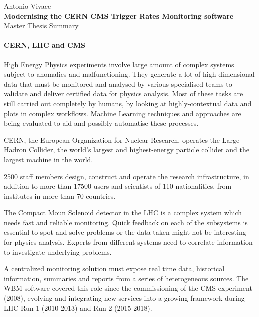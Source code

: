 \documentclass[a4, oneside, 10pt, nobib]{memoir}
\begin{document}
\thispagestyle{empty}

\begin{center}

	{\Large Antonio Vivace}
	\\
	\vspace{8mm}
	{\Huge \textbf{Modernising the CERN CMS Trigger Rates Monitoring software}}
	\\
	\vspace{8mm}
	{\huge Master Thesis Summary}
\end{center}

\pagebreak

		\paragraph{CERN, LHC and CMS} High Energy Physics experiments involve large amount of complex systems subject to anomalies and malfunctioning. They generate a lot of high dimensional data that must be monitored and analysed by various specialised teams to validate and deliver certified data for physics analysis. Most of these tasks are still carried out completely by humans, by looking at highly-contextual data and plots in complex workflows. Machine Learning techniques and approaches are being evaluated to aid and possibly automatise these processes.

		CERN, the European Organization for Nuclear Research, operates the Large Hadron Collider, the world's largest and highest-energy particle collider and the largest machine in the world.

		2500 staff members design, construct and operate the research infrastructure, in addition to more than 17500 users and scientists of 110 nationalities, from institutes in more than 70 countries.

		The Compact Moun Solenoid detector in the LHC is a complex system which needs fast and reliable monitoring. Quick feedback on each of the subsystems is essential to spot and solve problems or the data taken might not be interesting for physics analysis. Experts from different systems need to correlate information to investigate underlying problems.

		A centralized monitoring solution must expose real time data, historical information, summaries and reports from a series of heterogeneous sources. The WBM software covered this role since the commissioning of the CMS experiment (2008), evolving and integrating new services into a growing framework during LHC Run 1 (2010-2013) and Run 2 (2015-2018).
\end{document}
